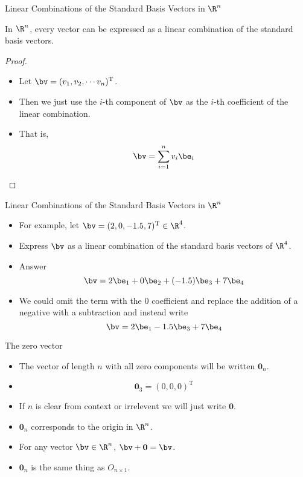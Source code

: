 \documentclass{beamer}
\begin{document}
\begin{frame}{Linear Combinations of the Standard Basis Vectors in $\R^n$}

\begin{lemma}
In $\R^n$, every vector can be expressed as a linear combination of the standard
basis vectors.
\end{lemma}

\begin{proof}
\begin{itemize}
\item Let $\bv = (v_1, v_2, \cdots v_n)^{\text{T}}$.
\item Then we just use the $i$-th component of $\bv$ as the $i$-th coefficient
of the linear combination.
\item That is,
$$\bv = \sum _{i=1}^{n} v_i \be_i$$
\end{itemize}
\end{proof}

\end{frame}

\begin{frame}{Linear Combinations of the Standard Basis Vectors in $\R^n$}

\begin{itemize}
\item For example, let $\bv = (2, 0, -1.5, 7)^{\text{T}} \in \R^4$.
\item Express $\bv$ as a linear combination of the standard basis vectors of
$\R^4$.
\item Answer $$\bv = 2 \be_1 + 0 \be_2 + (-1.5) \be_3 + 7 \be_4$$
\item We could omit the term with the 0 coefficient and replace the addition
of a negative with a subtraction and instead write
$$\bv = 2 \be_1 -1.5 \be_3 + 7 \be_4$$
\end{itemize}

\end{frame}

\begin{frame}{The zero vector}

\begin{itemize}
\item The vector of length $n$ with all zero components will be written $\mathbf{0}_n$.
\item $$\mathbf{0}_3 = (0,0,0)^{\text{T}}$$
\item If $n$ is clear from context or irrelevent we will just write $\mathbf{0}$.
\item $\mathbf{0}_n$ corresponds to the origin in $\R^n$.
\item For any vector $\bv\in\R^n$, $\bv+\mathbf{0} = \bv$.
\item $\mathbf{0}_n$ is the same thing as $O_{n\times 1}$.
\end{itemize}

\end{frame}
\end{document}
